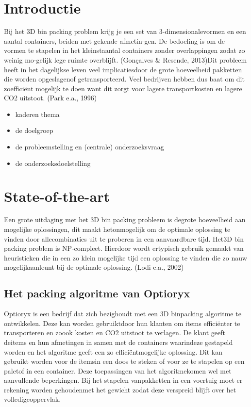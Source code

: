
\section{Introductie}%
\label{sec:introductie}

Bij het 3D bin packing problem krijg je een set van 3-dimensionalevormen en een aantal containers, beiden met gekende afmetin-gen. De bedoeling is om de vormen te stapelen in het kleinstaantal containers zonder overlappingen zodat zo weinig mo-gelijk lege ruimte overblijft.  (Gonçalves & Resende, 2013)Dit probleem heeft in het dagelijkse leven veel implicatiesdoor de grote hoeveelheid pakketten die worden opgeslagenof getransporteerd. Veel bedrijven hebben dus baat om dit zoefficiënt mogelijk te doen want dit zorgt voor lagere transportkosten en lagere CO2 uitstoot. (Park e.a., 1996)

\begin{itemize}
  \item kaderen thema
  \item de doelgroep
  \item de probleemstelling en (centrale) onderzoeksvraag
  \item de onderzoeksdoelstelling
\end{itemize}


\section{State-of-the-art}%
\label{sec:state-of-the-art}

Een grote uitdaging met het 3D bin packing probleem is degrote hoeveelheid aan mogelijke oplossingen, dit maakt hetonmogelijk om de optimale oplossing te vinden door allecombinaties uit te proberen in een aanvaardbare tijd.   Het3D bin packing problem is NP-compleet. Hierdoor wordt ertypisch gebruik gemaakt van heuristieken die in een zo klein mogelijke tijd een oplossing te vinden die zo nauw mogelijkaanleunt bij de optimale oplossing. (Lodi e.a., 2002)
\subsection{Het packing algoritme van Optioryx}
Optioryx is een bedrijf dat zich bezighoudt met een 3D binpacking algoritme te ontwikkelen. Deze kan worden gebruiktdoor hun klanten om items efficiënter te transporteren en zoook kosten en CO2 uitstoot te verlagen.  De klant geeft deitems en hun afmetingen in samen met de containers waarindeze gestapeld worden en het algoritme geeft een zo efficiëntmogelijke oplossing. Dit kan gebruikt worden voor de itemsin  een  doos  te  steken  of  voor  ze  te  stapelen  op  een  paletof in een container.   Deze toepassingen van het algoritmekomen wel met aanvullende beperkingen. Bij het stapelen vanpakketten in een voertuig moet er rekening worden gehoudenmet het gewicht zodat deze verspreid blijft over het volledigeoppervlak.

